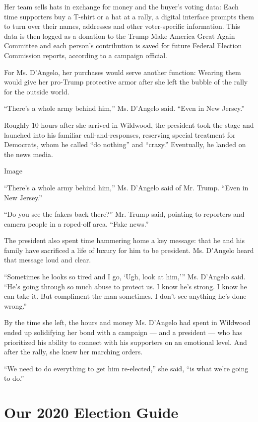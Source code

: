 Her team sells hats in exchange for money and the buyer's voting data:
Each time supporters buy a T-shirt or a hat at a rally, a digital
interface prompts them to turn over their names, addresses and other
voter-specific information. This data is then logged as a donation to
the Trump Make America Great Again Committee and each person's
contribution is saved for future Federal Election Commission reports,
according to a campaign official.

For Ms. D'Angelo, her purchases would serve another function: Wearing
them would give her pro-Trump protective armor after she left the bubble
of the rally for the outside world.

``There's a whole army behind him,'' Ms. D'Angelo said. ``Even in New
Jersey.''

Roughly 10 hours after she arrived in Wildwood, the president took the
stage and launched into his familiar call-and-responses, reserving
special treatment for Democrats, whom he called ``do nothing'' and
``crazy.'' Eventually, he landed on the news media.

Image

``There's a whole army behind him,'' Ms. D'Angelo said of Mr. Trump.
``Even in New Jersey.''

``Do you see the fakers back there?'' Mr. Trump said, pointing to
reporters and camera people in a roped-off area. ``Fake news.''

The president also spent time hammering home a key message: that he and
his family have sacrificed a life of luxury for him to be president. Ms.
D'Angelo heard that message loud and clear.

``Sometimes he looks so tired and I go, `Ugh, look at him,''' Ms.
D'Angelo said. ``He's going through so much abuse to protect us. I know
he's strong. I know he can take it. But compliment the man sometimes. I
don't see anything he's done wrong.''

By the time she left, the hours and money Ms. D'Angelo had spent in
Wildwood ended up solidifying her bond with a campaign --- and a
president --- who has prioritized his ability to connect with his
supporters on an emotional level. And after the rally, she knew her
marching orders.

``We need to do everything to get him re-elected,'' she said, ``is what
we're going to do.''

\hypertarget{our-2020-election-guide}{%
\section{Our 2020 Election Guide}\label{our-2020-election-guide}}

